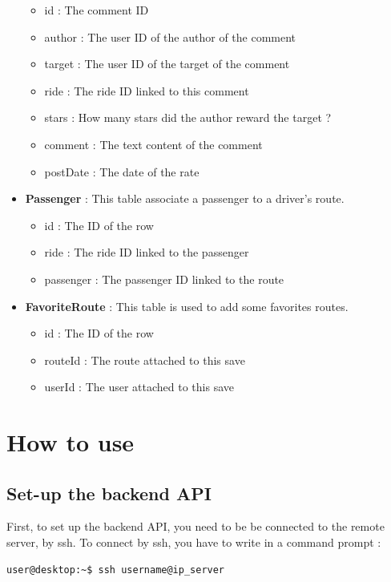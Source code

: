 \begin{itemize}
    \begin{itemize}
    	\item id : The comment ID
    	\item author : The user ID of the author of the comment
    	\item target : The user ID of the target of the comment
    	\item ride : The ride ID linked to this comment
    	\item stars : How many stars did the author reward the target ?
    	\item comment : The text content of the comment
    	\item postDate : The date of the rate
    \end{itemize}
    \item \textbf{Passenger} : This table associate a passenger to a driver's route.
    \begin{itemize}
    	\item id : The ID of the row
    	\item ride : The ride ID linked to the passenger
    	\item passenger : The passenger ID linked to the route
    \end{itemize}
    \item \textbf{FavoriteRoute} : This table is used to add some favorites routes.
	\begin{itemize}
    	\item id : The ID of the row
    	\item routeId : The route attached to this save
    	\item userId : The user attached to this save
    \end{itemize}
\end{itemize}

\section{How to use}

\subsection{Set-up the backend API}
First, to set up the backend API, you need to be be connected to the remote server, by ssh. To connect by ssh, you have to write in a command prompt :

\begin{lstlisting}[style=DOS]
user@desktop:~$ ssh username@ip_server
\end{lstlisting}

